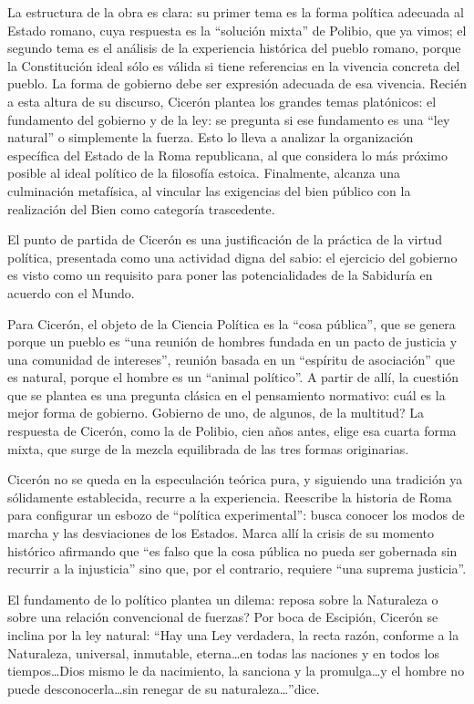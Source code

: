 \documentclass[
]{book}
\begin{document}
La estructura de la obra es clara: su primer tema es la forma política adecuada al Estado romano, cuya respuesta es la ``solución mixta'' de Polibio, que ya vimos; el segundo tema es el análisis de la experiencia histórica del pueblo romano, porque la Constitución ideal sólo es válida si tiene referencias en la vivencia concreta del pueblo. La forma de gobierno debe ser expresión adecuada de esa vivencia. Recién a esta altura de su discurso, Cicerón plantea los grandes temas platónicos: el fundamento del gobierno y de la ley: se pregunta si ese fundamento es una ``ley natural'' o simplemente la fuerza. Esto lo lleva a analizar la organización específica del Estado de la Roma republicana, al que considera lo más próximo posible al ideal político de la filosofía estoica. Finalmente, alcanza una culminación metafísica, al vincular las exigencias del bien público con la realización del Bien como categoría trascedente.

El punto de partida de Cicerón es una justificación de la práctica de la virtud política, presentada como una actividad digna del sabio: el ejercicio del gobierno es visto como un requisito para poner las potencialidades de la Sabiduría en acuerdo con el Mundo.

Para Cicerón, el objeto de la Ciencia Política es la ``cosa pública'', que se genera porque un pueblo es ``una reunión de hombres fundada en un pacto de justicia y una comunidad de intereses'', reunión basada en un ``espíritu de asociación'' que es natural, porque el hombre es un ``animal político''. A partir de allí, la cuestión que se plantea es una pregunta clásica en el pensamiento normativo: cuál es la mejor forma de gobierno. Gobierno de uno, de algunos, de la multitud? La respuesta de Cicerón, como la de Polibio, cien años antes, elige esa cuarta forma mixta, que surge de la mezcla equilibrada de las tres formas originarias.

Cicerón no se queda en la especulación teórica pura, y siguiendo una tradición ya sólidamente establecida, recurre a la experiencia. Reescribe la historia de Roma para configurar un esbozo de ``política experimental'': busca conocer los modos de marcha y las desviaciones de los Estados. Marca allí la crisis de su momento histórico afirmando que ``es falso que la cosa pública no pueda ser gobernada sin recurrir a la injusticia'' sino que, por el contrario, requiere ``una suprema justicia''.

El fundamento de lo político plantea un dilema: reposa sobre la Naturaleza o sobre una relación convencional de fuerzas? Por boca de Escipión, Cicerón se inclina por la ley natural: ``Hay una Ley verdadera, la recta razón, conforme a la Naturaleza, universal, inmutable, eterna\ldots en todas las naciones y en todos los tiempos\ldots Dios mismo le da nacimiento, la sanciona y la promulga\ldots y el hombre no puede desconocerla\ldots sin renegar de su naturaleza\ldots{}''dice.
\end{document}

